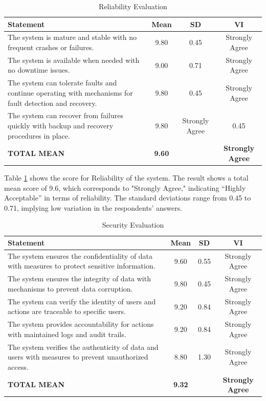 	\begin{table}[h!]
		\centering
		\caption{Reliability Evaluation}
		\label{relblty}
		\renewcommand{\arraystretch}{1.2}
		\begin{tabularx}{\linewidth}{|X|c|c|c|}
			\hline
			\textbf{Statement} & \textbf{Mean} & \textbf{SD} & \textbf{VI} \\ \hline
			The system is mature and stable with no frequent crashes or failures.
			& 9.80 & 0.45 & Strongly Agree \\ \hline
			The system is available when needed with no downtime issues.
			& 9.00 & 0.71 & Strongly Agree \\ \hline
			The system can tolerate faults and continue operating with mechanisms for fault detection and recovery.
			& 9.80 & 0.45 & Strongly Agree \\ \hline
			The system can recover from failures quickly with backup and recovery procedures in place.
			& 9.80 & Strongly Agree & 0.45\\ \hline
			\textbf{TOTAL MEAN} & \textbf{9.60} & & \textbf{Strongly Agree} \\ \hline
		\end{tabularx}
	\end{table}
	
	Table \ref{relblty} shows the score for Reliability of the system. The result shows a total mean score of 9.6, which corresponds to "Strongly Agree," indicating “Highly Acceptable” in terms of reliability. The standard deviations range from 0.45 to 0.71, implying low variation in the respondents’ answers.
	
	\begin{table}[h!]
		\centering
		\caption{Security Evaluation}
		\label{secrty}
		\renewcommand{\arraystretch}{1.2}
		\begin{tabularx}{\linewidth}{|X|c|c|c|}
			\hline
			\textbf{Statement} & \textbf{Mean} & \textbf{SD} & \textbf{VI} \\ \hline
			The system ensures the confidentiality of data with measures to protect sensitive information.
			& 9.60 & 0.55 & Strongly Agree \\ \hline
			The system ensures the integrity of data with mechanisms to prevent data corruption.
			& 9.80 & 0.45 & Strongly Agree \\ \hline
			The system can verify the identity of users and actions are traceable to specific users.
			& 9.20 & 0.84 & Strongly Agree \\ \hline
			The system provides accountability for actions with maintained logs and audit trails.
			& 9.20 & 0.84 & Strongly Agree \\ \hline
			The system verifies the authenticity of data and users with measures to prevent unauthorized access.
			& 8.80 & 1.30 & Strongly Agree \\ \hline
			\textbf{TOTAL MEAN} & \textbf{9.32} & & \textbf{Strongly Agree} \\ \hline
		\end{tabularx}
	\end{table}
	
